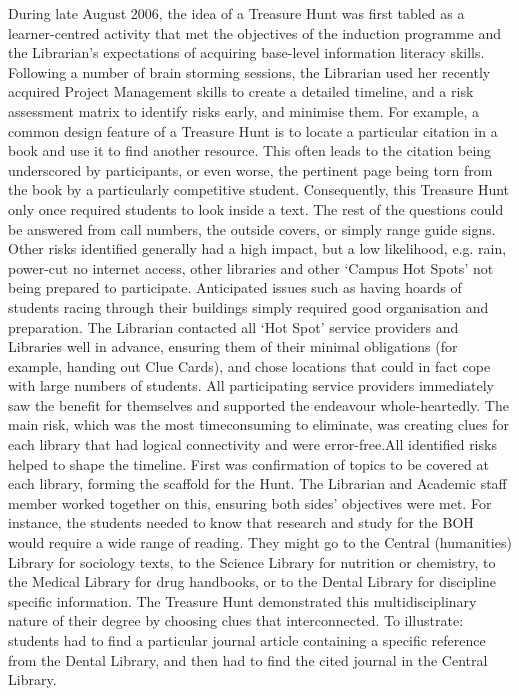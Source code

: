During late August 2006, the idea of a Treasure Hunt was first tabled as a learner-centred 
activity that met the objectives of the induction programme and the Librarian’s 
expectations of acquiring base-level information literacy skills. Following a number of brain 
storming sessions, the Librarian used her recently acquired Project Management skills to 
create a detailed timeline, and a risk assessment matrix to identify risks early, and 
minimise them. For example, a common design feature of a Treasure Hunt is to locate a 
particular citation in a book and use it to find another resource. This often leads to the 
citation being underscored by participants, or even worse, the pertinent page being torn 
from the book by a particularly competitive student. Consequently, this Treasure Hunt only 
once required students to look inside a text. The rest of the questions could be answered 
from call numbers, the outside covers, or simply range guide signs. Other risks identified 
generally had a high impact, but a low likelihood, e.g. rain, power-cut no internet access, 
other libraries and other ‘Campus Hot Spots’ not being prepared to participate. Anticipated 
issues such as having hoards of students racing through their buildings simply required 
good organisation and preparation. The Librarian contacted all ‘Hot Spot’ service providers 
and Libraries well in advance, ensuring them of their minimal obligations (for example, 
handing out Clue Cards), and chose locations that could in fact cope with large numbers of 
students. All participating service providers immediately saw the benefit for themselves 
and supported the endeavour whole-heartedly. The main risk, which was the most timeconsuming to eliminate, was creating clues for each library that had logical connectivity and were error-free.All identified risks helped to shape the timeline. First was confirmation of topics to be covered at each library, forming the scaffold for the Hunt. The Librarian and Academic 
staff member worked together on this, ensuring both sides’ objectives were met. For 
instance, the students needed to know that research and study for the BOH would require 
a wide range of reading. They might go to the Central (humanities) Library for sociology 
texts, to the Science Library for nutrition or chemistry, to the Medical Library for drug 
handbooks, or to the Dental Library for discipline specific information. The Treasure Hunt 
demonstrated this multidisciplinary nature of their degree by choosing clues that interconnected. To illustrate: students had to find a particular journal article containing a specific reference from the Dental Library, and then had to find the cited journal in the 
Central Library. 

